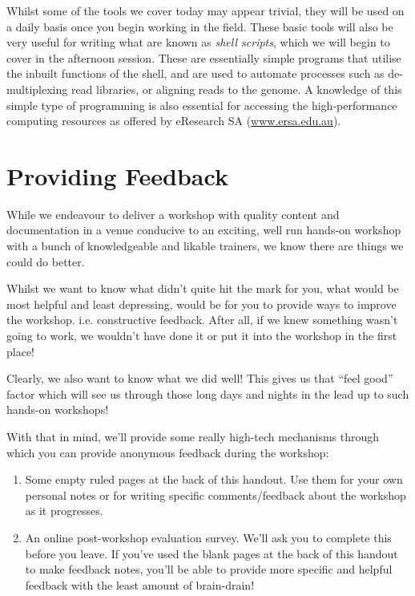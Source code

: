 Whilst some of the tools we cover today may appear trivial, they will be used on a daily basis once you begin working in the field.
These basic tools will also be very useful for writing what are known as \textit{shell scripts}, which we will begin to cover in the afternoon session.
These are essentially simple programs that utilise the inbuilt functions of the shell, and are used to automate processes such as de-multiplexing read libraries, or aligning reads to the genome.
A knowledge of this simple type of programming is also essential for accessing the high-performance computing resources as offered by eResearch SA (\url{www.ersa.edu.au}).


\section{Providing Feedback}
While we endeavour to deliver a workshop with quality content and documentation in a venue conducive to an exciting, well run hands-on workshop with a bunch of knowledgeable and likable
trainers, we know there are things we could do better.

Whilst we want to know what didn't quite hit the mark for you, what would be most helpful and least
depressing, would be for you to provide ways to improve the workshop. i.e. constructive feedback.
After all, if we knew something wasn't going to work, we wouldn't have done it or put it into the
workshop in the first place!

Clearly, we also want to know what we did well! This gives us that ``feel good'' factor which will
see us through those long days and nights in the lead up to such hands-on workshops!

With that in mind, we'll provide some really high-tech mechanisms through which you
can provide anonymous feedback during the workshop:
\begin{enumerate}
  
  \item Some empty ruled pages at the back of this handout. Use them for your own personal notes or
  for writing specific comments/feedback about the workshop as it progresses.
  
  \item An online post-workshop evaluation survey. We'll ask you to complete this before you leave.
  If you've used the blank pages at the back of this handout to make feedback notes, you'll be able
  to provide more specific and helpful feedback with the least amount of brain-drain!
  
\end{enumerate}


